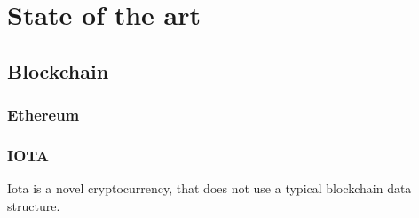 



\section{State of the art}


\subsection{Blockchain}
\subsubsection{Ethereum}
\subsubsection{IOTA}
Iota \cite{popovtangle} is a novel cryptocurrency, that does not use a typical blockchain data structure.  
